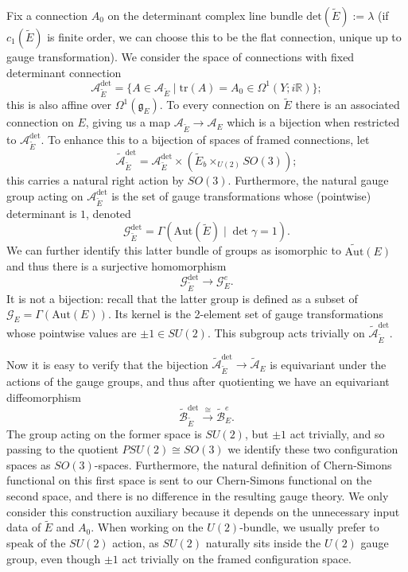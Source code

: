 \documentclass{memo-l}
\theoremstyle{definition}
\theoremstyle{remark}
\numberwithin{section}{chapter}
\numberwithin{equation}{chapter}
\begin{document}
Fix a connection $A_0$ on the determinant complex line bundle $\text{det}(\tilde E) := \lambda$ (if $c_1(\tilde E)$ is finite order, we can choose this to be the flat connection, unique up to gauge transformation). We consider the space of connections with fixed determinant connection $$\mathcal A_{\tilde E}^{\det} = \{A \in \mathcal A_{\tilde E} \mid \text{tr}(A) = A_0 \in \Omega^1(Y;i\mathbb R)\};$$ this is also affine over $\Omega^1(\mathfrak g_E)$. To every connection on $\tilde E$ there is an associated connection on $E$, giving us a map $\mathcal A_{\tilde E} \to \mathcal A_E$ which is a bijection when restricted to $\mathcal A_{\tilde E}^\text{det}$. To enhance this to a bijection of spaces of framed connections, let 
$$\widetilde{\mathcal A}_{\tilde E}^\text{det} = \mathcal A_{\tilde E}^{\text{det}} \times (\tilde E_b \times_{U(2)} SO(3));$$ 
this carries a natural right action by $SO(3)$. Furthermore, the natural gauge group acting on $\mathcal A_{\tilde E}^\text{det}$ is the set of gauge transformations whose (pointwise) determinant is $1$, denoted 
$$\mathcal G_{\tilde E}^{\text{det}} = \Gamma(\text{Aut}(\tilde E) \mid \det \gamma = 1).$$ 
We can further identify this latter bundle of groups as isomorphic to $\widetilde{\text{Aut}}(E)$ and thus there is a surjective homomorphism $$\mathcal G_{\tilde E}^{\text{det}} \to \mathcal G^e_E.$$ It is not a bijection: recall that the latter group is defined as a subset of $\mathcal G_E = \Gamma(\text{Aut}(E))$. Its kernel is the 2-element set of gauge transformations whose pointwise values are $\pm 1 \in SU(2)$. This subgroup acts trivially on $\widetilde{\mathcal A}_{\tilde E}^\text{det}$.

Now it is easy to verify that the bijection $\widetilde{\mathcal A}_{\tilde E}^\text{det} \to \widetilde{\mathcal A}_E$ is equivariant under the actions of the gauge groups, and thus after quotienting we have an equivariant diffeomorphism \begin{equation}\label{U(2)}\widetilde{\mathcal B}_{\tilde E}^\text{det} \xrightarrow{\cong} \widetilde{\mathcal B}^e_E.\end{equation} The group acting on the former space is $SU(2)$, but $\pm 1$ act trivially, and so passing to the quotient $PSU(2) \cong SO(3)$ we identify these two configuration spaces as $SO(3)$-spaces. Furthermore, the natural definition of Chern-Simons functional on this first space is sent to our Chern-Simons functional on the second space, and there is no difference in the resulting gauge theory. We only consider this construction auxiliary because it depends on the unnecessary input data of $\tilde E$ and $A_0$. When working on the $U(2)$-bundle, we usually prefer to speak of the $SU(2)$ action, as $SU(2)$ naturally sits inside the $U(2)$ gauge group, even though $\pm 1$ act trivially on the framed configuration space.
\end{document}
